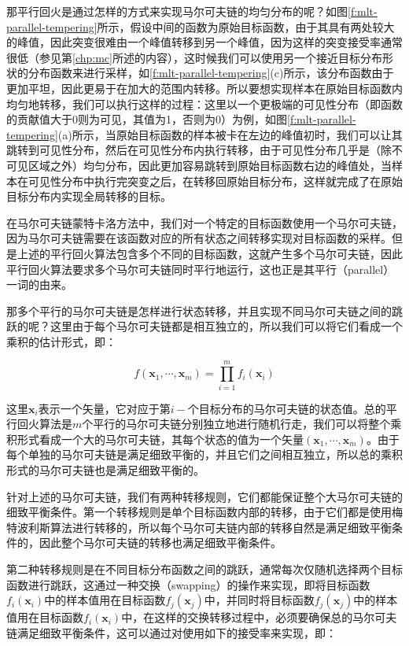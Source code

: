 那平行回火是通过怎样的方式来实现马尔可夫链的均匀分布的呢？如图\ref{f:mlt-parallel-tempering}所示，假设中间的函数为原始目标函数，由于其具有两处较大的峰值，因此突变很难由一个峰值转移到另一个峰值，因为这样的突变接受率通常很低（参见第\ref{chp:mc}所述的内容），这时候我们可以使用另一个接近目标分布形状的分布函数来进行采样，如\ref{f:mlt-parallel-tempering}(c)所示，该分布函数由于更加平坦，因此更易于在加大的范围内转移。所以要想实现样本在原始目标函数内均匀地转移，我们可以执行这样的过程：这里以一个更极端的可见性分布（即函数的贡献值大于0则为可见，其值为1，否则为0）为例，如图\ref{f:mlt-parallel-tempering}(a)所示，当原始目标函数的样本被卡在左边的峰值初时，我们可以让其跳转到可见性分布，然后在可见性分布内执行转移，由于可见性分布几乎是（除不可见区域之外）均匀分布，因此更加容易跳转到原始目标函数右边的峰值处，当样本在可见性分布中执行完突变之后，在转移回原始目标分布，这样就完成了在原始目标分布内实现全局转移的目标。

在马尔可夫链蒙特卡洛方法中，我们对一个特定的目标函数使用一个马尔可夫链，因为马尔可夫链需要在该函数对应的所有状态之间转移实现对目标函数的采样。但是上述的平行回火算法包含多个不同的目标函数，这就产生多个马尔可夫链，因此平行回火算法要求多个马尔可夫链同时平行地运行，这也正是其平行（parallel）一词的由来。

那多个平行的马尔可夫链是怎样进行状态转移，并且实现不同马尔可夫链之间的跳跃的呢？这里由于每个马尔可夫链都是相互独立的，所以我们可以将它们看成一个乘积的估计形式，即：

\begin{equation}
	f(\mathbf{x}_1,\cdots,\mathbf{x}_m)=\prod^{m}_{i=1}f_i(\mathbf{x}_i)
\end{equation}

\noindent 这里$\mathbf{x}_i$表示一个矢量，它对应于第$i-$个目标分布的马尔可夫链的状态值。总的平行回火算法是$m$个平行的马尔可夫链分别独立地进行随机行走，我们可以将整个乘积形式看成一个大的马尔可夫链，其每个状态的值为一个矢量$(\mathbf{x}_1,\cdots,\mathbf{x}_m)$。由于每个单独的马尔可夫链是满足细致平衡的，并且它们之间相互独立，所以总的乘积形式的马尔可夫链也是满足细致平衡的。

针对上述的马尔可夫链，我们有两种转移规则，它们都能保证整个大马尔可夫链的细致平衡条件。第一个转移规则是单个目标函数内部的转移，由于它们都是使用梅特波利斯算法进行转移的，所以每个马尔可夫链内部的转移自然是满足细致平衡条件的，因此整个马尔可夫链的转移也满足细致平衡条件。

第二种转移规则是在不同目标分布函数之间的跳跃，通常每次仅随机选择两个目标函数进行跳跃，这通过一种交换（swapping）的操作来实现，即将目标函数$f_i(\mathbf{x}_i)$中的样本值用在目标函数$f_j(\mathbf{x}_j)$中，并同时将目标函数$f_j(\mathbf{x}_j)$中的样本值用在目标函数$f_i(\mathbf{x}_i)$中，在这样的交换转移过程中，必须要确保总的马尔可夫链满足细致平衡条件，这可以通过对使用如下的接受率来实现，即：

